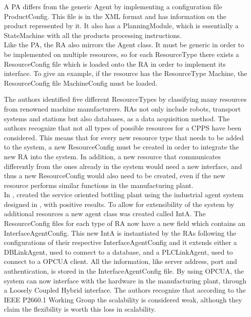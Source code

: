 A \gls{PA} differs from the generic Agent by implementing a configuration file ProductConfig. This file is in the \gls{XML} format and has information on the product represented by it. It also has a PlanningModule, which is essentially a StateMachine with all the products processing instructions.\\

Like the \gls{PA}, the \gls{RA} also mirrors the Agent class. It must be generic in order to be implemented on multiple resources, so for each ResourceType there exists a ResourceConfig file which is loaded onto the \gls{RA} in order to implement its interface. To give an example, if the resource has the ResourceType Machine, the ResourceConfig file MachineConfig must be loaded.

The authors identified five different ResourceTypes by classifying many resources from renowned machine manufacturers. \gls{RA}s not only include robots, transport systems and stations but also databases, as a data acquisition method. The authors recognize that not all types of possible resources for a \gls{CPPS} have been considered. This means that for every new resource type that needs to be added to the system, a new ResourceConfig must be created in order to integrate the new \gls{RA} into the system. In addition, a new resource that communicates differently from the ones already in the system would need a new interface, and thus a new ResourceConfig would also need to be created, even if the new resource performs similar functions in the manufacturing plant.\\

In \cite{bottling_plant_part2}, \citeauthor{bottling_plant_part2} created the service oriented bottling plant using the industrial agent system designed in \cite{bottling_plant_part1}, with positive results. To allow for extensibility of the system by additional resources a new agent class was created called \gls{IntA}. The ResourceConfig files for each type of \gls{RA} now have a new field which contains an InterfaceAgentConfig. This new \gls{IntA} is instantiated by the \gls{RA}s following the configurations of their respective InterfaceAgentConfig and it extends either a DBLinkAgent, used to connect to a database, and a PLCLinkAgent, used to connect to a \gls{OPCUA} client. All the information, like server address, port and authentication, is stored in the InterfaceAgentConfig file. By using \gls{OPCUA}, the system can now interface with the hardware in the manufacturing plant, through a Loosely Coupled Hybrid interface. The authors recognize that according to the IEEE P2660.1 Working Group the scalability is considered weak, although they claim the flexibility is worth this loss in scalability.\\

